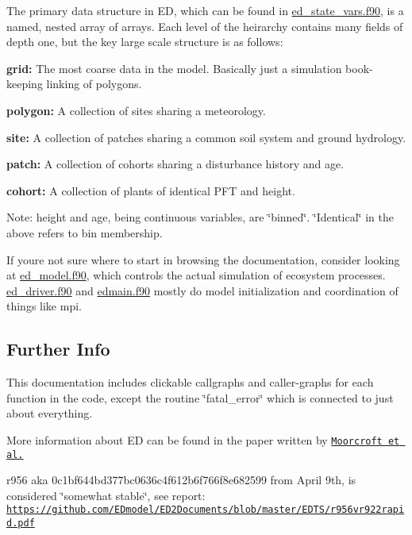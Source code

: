 The primary data structure in ED, which can be found in \hyperlink{ed__state__vars_8_f90}{ed\+\_\+state\+\_\+vars.\+f90}, is a named, nested array of arrays. Each level of the heirarchy contains many fields of depth one, but the key large scale structure is as follows\+:
\begin{DoxyItemize}
\item {\bfseries  grid\+: } The most coarse data in the model. Basically just a simulation book-\/keeping linking of polygons.
\item {\bfseries  polygon\+: } A collection of sites sharing a meteorology.
\item {\bfseries  site\+: } A collection of patches sharing a common soil system and ground hydrology.
\item {\bfseries  patch\+: } A collection of cohorts sharing a disturbance history and age.
\item {\bfseries  cohort\+: } A collection of plants of identical P\+FT and height.
\end{DoxyItemize}

Note\+: height and age, being continuous variables, are \char`\"{}binned\char`\"{}. \char`\"{}\+Identical\char`\"{} in the above refers to bin membership.

If you\textquotesingle{}re not sure where to start in browsing the documentation, consider looking at \hyperlink{ed__model_8_f90}{ed\+\_\+model.\+f90}, which controls the actual simulation of ecosystem processes. \hyperlink{ed__driver_8_f90}{ed\+\_\+driver.\+f90} and \hyperlink{edmain_8_f90}{edmain.\+f90} mostly do model initialization and coordination of things like mpi.

\subsection*{\label{_info}%
 Further Info }

This documentation includes clickable callgraphs and caller-\/graphs for each function in the code, except the routine \char`\"{}fatal\+\_\+error\char`\"{} which is connected to just about everything.

More information about ED can be found in the paper written by \href{http://flux.aos.wisc.edu/~adesai/documents/macrosys_papers-ankur/modeling/Moorcroft-EcolMono-EDmodel.pdf}{\tt Moorcroft et al.}

r956 aka 0c1bf644bd377bc0636c4f612b6f766f8e682599 from April 9th, is considered \char`\"{}somewhat stable\char`\"{}, see report\+: \href{https://github.com/EDmodel/ED2Documents/blob/master/EDTS/r956vr922rapid.pdf}{\tt https\+://github.\+com/\+E\+Dmodel/\+E\+D2\+Documents/blob/master/\+E\+D\+T\+S/r956vr922rapid.\+pdf}

